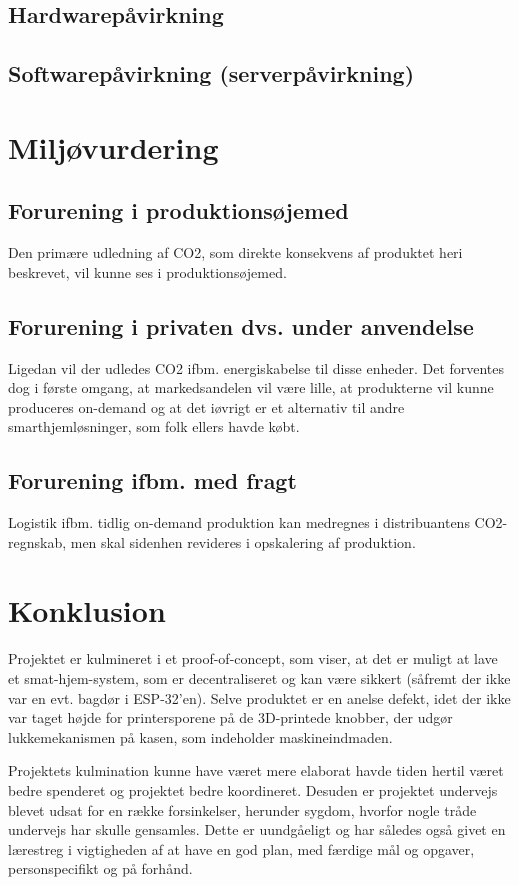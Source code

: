\documentclass[11pt]{article}
\begin{document}
\subsection{Hardwarepåvirkning}
\label{sec:org9e89a3f}
\subsection{Softwarepåvirkning (serverpåvirkning)}
\label{sec:org15c2cb6}

\newpage
\section{Miljøvurdering}
\label{sec:miljoevurdering}
\subsection{Forurening i produktionsøjemed}
Den primære udledning af CO2, som direkte konsekvens af produktet heri beskrevet, vil kunne ses i produktionsøjemed.
\subsection{Forurening i privaten dvs. under anvendelse}
Ligedan vil der udledes CO2 ifbm. energiskabelse til disse enheder. Det forventes dog i første omgang, at markedsandelen vil være lille, at produkterne vil kunne produceres on-demand og at det iøvrigt er et alternativ til andre smarthjemløsninger, som folk ellers havde købt.
\subsection{Forurening ifbm. med fragt}
Logistik ifbm. tidlig on-demand produktion kan medregnes i distribuantens CO2-regnskab, men skal sidenhen revideres i opskalering af produktion. 

\newpage
\section{Konklusion}
\label{sec:org7454aed}
Projektet er kulmineret i et proof-of-concept, som viser, at det er muligt at lave et smat-hjem-system, som er decentraliseret og kan være sikkert (såfremt der ikke var en evt. bagdør i ESP-32'en). Selve produktet er en anelse defekt, idet der ikke var taget højde for printersporene på de 3D-printede knobber, der udgør lukkemekanismen på kasen, som indeholder maskineindmaden.

Projektets kulmination kunne have været mere elaborat havde tiden hertil været bedre spenderet og projektet bedre koordineret. Desuden er projektet undervejs blevet udsat for en række forsinkelser, herunder sygdom, hvorfor nogle tråde undervejs har skulle gensamles. Dette er uundgåeligt og har således også givet en lærestreg i vigtigheden af at have en god plan, med færdige mål og opgaver, personspecifikt og på forhånd.

\newpage
\printbibliography
\end{document}
